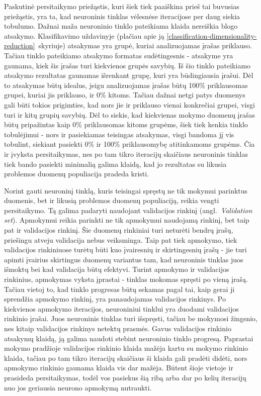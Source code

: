 \documentclass{VUMIFPSbakalaurinis}
\begin{document}
Paskutinė persitaikymo priežąstis, kuri šiek tiek paaiškina prieš tai buvusias priežąstis, yra ta, kad neuroninis tinklas vėlesnėse iteracijose per daug siekia tobulumo.
Dažnai maža neuroninio tinklo pateikiama klaida nereiškia blogo atsakymo.
Klasifikavimo uždavinyje (plačiau apie ją \ref{classification-dimensionality-reduction}~skyriuje) atsakymas yra grupė, kuriai analizuojamas įrašas priklauso.
Tačiau tinklo pateikiamo atsakymo formatas sudėtingesnis - atsakyme yra gaunama, kiek šis įrašas turi kiekvienos grupės savybių.
Iš šio tinklo pateikiamo atsakymo rezultatas gaunamas išrenkant grupę, kuri yra būdingiausia įrašui.
Dėl to atsakymas būtų idealus, jeigu analizuojamas įrašas būtų 100\% priklausomas grupei, kuriai jis priklauso, ir 0\% kitoms.
Tačiau dažnai netgi patys duomenys gali būti tokios prigimties, kad nors jie ir priklauso vienai konkrečiai grupei, visgi turi ir kitų grupių savybių.
Dėl to siekis, kad kiekvienas mokymo duomenų įrašas būtų pripažintas kaip 0\% priklausomas kitoms grupėms, šiek tiek kenkia tinklo tobulėjimui - nors ir pasiekiamas teisingas atsakymas, visgi bandoma jį vis tobulint, siekiant pasiekti 0\% ir 100\% priklausomybę atitinkamoms grupėms.
Čia ir įvyksta persitaikymas, nes po tam tikro iteracijų skaičiaus neuroninis tinklas tiek bando pasiekti minimalią galima klaidą, kad jo rezultatas su likusia problemos duomenų populiacija pradeda kristi.

Norint gauti neuroninį tinklą, kuris teisingai spręstų ne tik mokymui parinktus duomenis, bet ir likusią problemos duomenų populiaciją, reikia vengti persitaikymo.
Tą galima padaryti naudojant validacijos rinkinį (angl.~\textit{Validation set}).
Apmokymui reikia parinkti ne tik apmokymui naudojamą rinkinį, bet taip pat ir validacijos rinkinį.
Šie duomenų rinkiniai turi neturėti bendrų įrašų, priešingu atveju validacija nebus veiksminga.
Taip pat tiek apmokymo, tiek validacijos rinkiniuose turėtų būti kuo įvairesnių ir skirtingesnių įrašų - jie turi apimti įvairius skirtingus duomenų variantus tam, kad neuroninis tinklas juos išmoktų bei kad validacija būtų efektyvi.
Turint apmokymo ir validacijos rinkinius, apmokymas vyksta įprastai - tinklas mokomas spręsti po vieną įrašą.
Tačiau vietoj to, kad tinklo progresas būtų sekamas pagal tai, kaip gerai ji sprendžia apmokymo rinkinį, yra panaudojamas validacijos rinkinys.
Po kiekvienos apmokymo iteracijos, neuroniniui tinklui yra duodami validacijos rinkinio įrašai.
Juos neuroninis tinklas turi išspręsti, tačiau be mokymosi žingsnio, nes kitaip validacijos rinkinys netektų prasmės.
Gavus validacijos rinkinio atsakymų klaidą, ją galima naudoti stebint neuroninio tinklo progresą.
Paprastai mokymo pradžioje validacijos rinkinio klaida mažėja kartu su mokymo rinkinio klaida, tačiau po tam tikro iteracijų skaičiaus ši klaida gali pradėti didėti, nors apmokymo rinkinio gaunama klaida vis dar mažėja.
Būtent šioje vietoje ir prasideda persitaikymas, todėl vos pasiekus šią ribą arba dar po kelių iteracijų nuo jos geriausia neurono apmokymą nutraukti.
\end{document}
